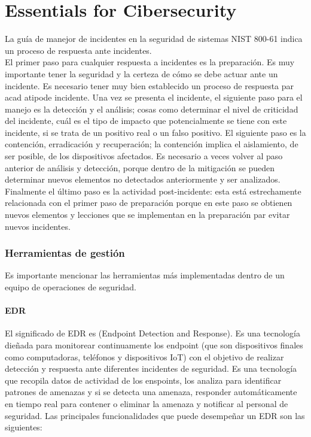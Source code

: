 \chapter{Essentials for Cibersecurity}

    La guía de manejor de incidentes en la seguridad de sistemas NIST 800-61 indica un proceso de respuesta ante incidentes. \\

    El primer paso para cualquier respuesta a incidentes es la preparación. Es muy importante tener la seguridad y la certeza de cómo se debe actuar ante un incidente. Es necesario tener muy bien establecido un proceso de respuesta par acad atipode incidente. Una vez se presenta el incidente, el siguiente paso para el manejo es la detección y el análisis; cosas como determinar el nivel de criticidad del incidente, cuál es el tipo de impacto que potencialmente se tiene con este incidente, si se trata de un positivo real o un falso positivo. El siguiente paso es la contención, erradicación y recuperación; la contención implica el aislamiento, de ser posible, de los dispositivos afectados. Es necesario a veces volver al paso anterior de análisis y detección, porque dentro de la mitigación se pueden determinar nuevos elementos no detectados anteriormente y ser analizados. Finalmente el último paso es la actividad post-incidente: esta está estrechamente relacionada con el primer paso de preparación porque en este paso se obtienen nuevos elementos y lecciones que se implementan en la preparación par evitar nuevos incidentes.

    \subsection{Herramientas de gestión}
        Es importante mencionar las herramientas más implementadas dentro de un equipo de operaciones de seguridad. 
        \subsubsection{EDR} El significado de EDR es (Endpoint Detection and Response). Es una tecnología dieñada para monitorear continuamente los endpoint (que son dispositivos finales como computadoras, teléfonos y dispositivos IoT) con el objetivo de realizar detección y respuesta ante diferentes incidentes de seguridad. Es una tecnología que recopila datos de actividad de los enspoints, los analiza para identificar patrones de amenazas y si se detecta una amenaza, responder automáticamente en tiempo real para contener o eliminar la amenaza y notificar al personal de seguridad. Las principales funcionalidades que puede desempeñar un EDR son las siguientes:

